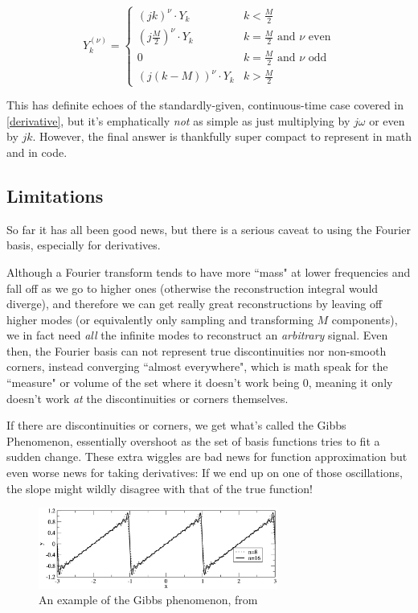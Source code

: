 \documentclass[10pt]{article}
\begin{document}
\begin{equation}\label{Y_nu}
Y^{(\nu)}_k = \begin{cases} (j k)^\nu \cdot Y_k & k < \frac{M}{2} \\ (j \frac{M}{2})^\nu \cdot Y_k & k = \frac{M}{2} \text{ and } \nu \text{ even} \\ 0 & k = \frac{M}{2} \text{ and } \nu \text{ odd} \\ (j(k - M))^\nu \cdot Y_k & k > \frac{M}{2} \end{cases}
\end{equation}

This has definite echoes of the standardly-given, continuous-time case covered in \autoref{derivative}, but it's emphatically \textit{not} as simple as just multiplying by $j\omega$ or even by $j k$. However, the final answer is thankfully super compact to represent in math and in code.

\subsection{Limitations}

So far it has all been good news, but there is a serious caveat to using the Fourier basis, especially for derivatives.

Although a Fourier transform tends to have more ``mass" at lower frequencies and fall off as we go to higher ones (otherwise the reconstruction integral would diverge), and therefore we can get really great reconstructions by leaving off higher modes\cite{kutz} (or equivalently only sampling and transforming $M$ components), we in fact need \textit{all} the infinite modes to reconstruct an \textit{arbitrary} signal\cite{oppenheim}. Even then, the Fourier basis can not represent true discontinuities nor non-smooth corners, instead converging ``almost everywhere", which is math speak for the ``measure" or volume of the set where it doesn't work being 0, meaning it only doesn't work \textit{at} the discontinuities or corners themselves.\cite{oppenheim}

If there are discontinuities or corners, we get what's called the Gibbs Phenomenon\cite{oppenheim}, essentially overshoot as the set of basis functions tries to fit a sudden change. These extra wiggles are bad news for function approximation but even worse news for taking derivatives: If we end up on one of those oscillations, the slope might wildly disagree with that of the true function!

\begin{figure}[h!]
	\centering
	\includegraphics[width=0.7\textwidth]{gibbs.png}
	\caption*{An example of the Gibbs phenomenon, from \cite{kutz}}
\end{figure}
\end{document}
